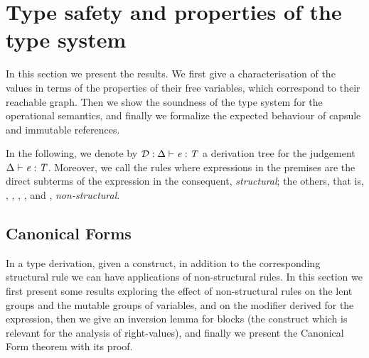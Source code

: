 \section{ {Type safety and properties of the type system}}\label{sect:results}
 {In this section we present  {the results}. We first give a characterisation of the values in terms of the
properties of their free variables, which  {correspond to} their reachable graph. Then we show the soundness
of the type system for the operational semantics, and finally we formalize the expected behaviour of capsule and
immutable references.}

 {In the following, we denote by ${\cal D}:\Delta\vdash \mathit{e}:\mathit{T}$ a derivation tree for the judgement 
 $\Delta\vdash \mathit{e}:\mathit{T}$. 
Moreover, we call the rules where expressions in the premises are the direct subterms of the expression in the consequent,  \emph{structural}; the others, that is, , , , , and ,  \emph{non-structural}.

\subsection{Canonical Forms}
In a type derivation, given a construct, %
in addition to the corresponding structural rule we can have applications of non-structural rules.  
In this section we first present some results exploring the effect of non-structural rules on the lent groups and the mutable groups of variables, and on the modifier derived for
the expression, then we give an inversion lemma for blocks (the construct which is relevant
for the analysis of right-values), and finally we present the Canonical Form theorem with its proof. 

}
